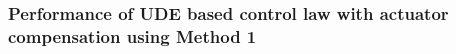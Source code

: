 \documentclass[table,10pt,red]{beamer}	%
\begin{document}

\begin{frame}
\frametitle{Performance of UDE based control law with actuator compensation using Method 1}


\end{frame}
\end{document}
